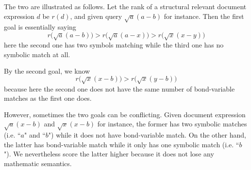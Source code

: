 \documentclass{acm_proc_article-sp}
\begin{document}
The two are illustrated as follows. 
Let the rank of a structural relevant document expression $d$ be $r(d)$, and given query $\sqrt a (a - b)$ for instance. 
Then the first goal is essentially saying 
$$
r\big(\sqrt a (a - b)\big) > r\big(\sqrt a (a - x)\big) > r\big(\sqrt x (x - y)\big)
$$
here the second one has two symbols matching while the third one has no symbolic match at all. 

By the second goal, we know
$$
r\big(\sqrt x (x - b)\big) > r\big(\sqrt x (y - b)\big)
$$
because here the second one does not have the same number of bond-variable matches as the first one does.

However, sometimes the two goals can be conflicting.
Given document expression $\sqrt a (x - b)$ and $\sqrt x (x - b)$ for instance, the former has two symbolic matches (i.e. ``$a$" and ``$b$") while it does not have bond-variable match. On the other hand, the latter has bond-variable match while it only has one symbolic match (i.e. ``$b$"). 
We nevertheless score the latter higher because it does not lose any mathematic semantics. 
\end{document}
